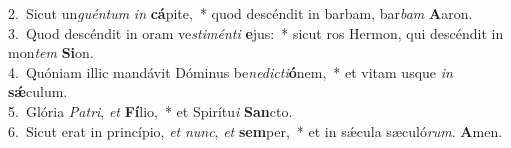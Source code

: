 {2.~}Sicut un\textit{guén}\textit{tum} \textit{in} \textbf{cá}pite,~* quod descéndit in barbam, bar\textit{bam} \textbf{A}aron.\\
{3.~}Quod descéndit in oram ve\textit{sti}\textit{mén}\textit{ti} \textbf{e}jus:~* sicut ros Hermon, qui descéndit in mon\textit{tem} \textbf{Si}on.\\
{4.~}Quóniam illic mandávit Dóminus be\textit{ne}\textit{di}\textit{cti}\textbf{ó}nem,~* et vitam usque \textit{in} \textbf{sǽ}culum.\\
{5.~}Glória \textit{Pa}\textit{tri}, \textit{et} \textbf{Fí}lio,~* et Spirítu\textit{i} \textbf{San}cto.\\
{6.~}Sicut erat in princípio, \textit{et} \textit{nunc}, \textit{et} \textbf{sem}per,~* et in sǽcula sæculó\textit{rum}. \textbf{A}men.\\
